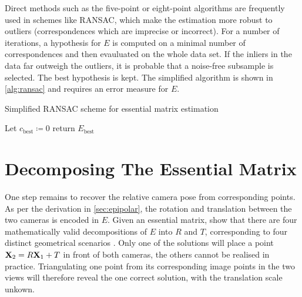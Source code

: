 Direct methods such as the five-point or eight-point algorithms are frequently
used in schemes like RANSAC, which make the estimation more robust to outliers
(correspondences which are imprecise or incorrect). For a number of iterations,
a hypothesis for $E$ is computed on a minimal number of correspondences and then
evauluated on the whole data set. If the inliers in the data far outweigh the
outliers, it is probable that a noise-free subsample is selected. The best hypothesis is kept.
The simplified algorithm is shown in \autoref{alg:ransac}
\citep[c.f.][ch. 4.8]{h&z2004} and requires an error measure for $E$.


   \SetAlCapSkip{1ex}
\begin{algorithm}
   \caption{Simplified RANSAC scheme for essential matrix estimation}
   \label{alg:ransac}
   Let $c_{\text{best}} \coloneqq 0$\;
   return $E_{\text{best}}$
\end{algorithm}

\section{Decomposing The Essential Matrix}

One step remains to recover the relative camera pose from corresponding points.
As per the derivation in \autoref{sec:epipolar}, the rotation and translation
between the two cameras is encoded in $E$. Given an essential matrix,
\citet[ch. 9.6]{h&z2004} show that there are four mathematically valid
decompositions of $E$ into $R$ and $T$, corresponding to four distinct
geometrical scenarios \citep[see][ch. 9.6]{h&z2004}. Only one of the
solutions will place a point $\mathbf{X}_2 = R\mathbf{X}_1 + T$ in front of both
cameras, the others cannot be realised in practice.  Triangulating one point
from its corresponding image points in the two views will therefore reveal the
one correct solution, with the translation scale unkown.
